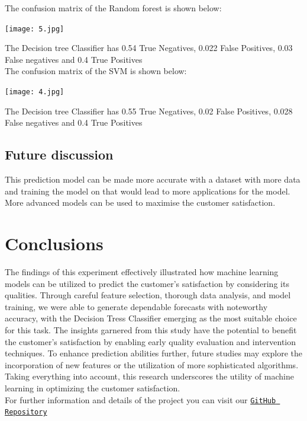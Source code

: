 \documentclass{article}
\begin{document}
The confusion matrix of the Random forest is shown below:\\
\begin{center}
        \texttt{[image: 5.jpg]}
\end{center}



The Decision tree Classifier has 0.54 True Negatives, 0.022 False Positives, 0.03 False negatives and 0.4 True Positives \\

The confusion matrix of the SVM is shown below:\\
\begin{center}
        \texttt{[image: 4.jpg]}
\end{center}



The Decision tree Classifier has 0.55 True Negatives, 0.02 False Positives, 0.028 False negatives and 0.4 True Positives \\


\subsection{Future discussion}
This prediction model can be made more accurate with a dataset with more data and training the model on that would lead to more applications for the model.
More advanced models can be used to maximise the customer satisfaction.

\section{Conclusions}
The findings of this experiment effectively illustrated how machine learning models can be utilized to predict the customer's satisfaction by considering its  qualities. Through careful feature selection, thorough data analysis, and model training, we were able to generate dependable forecasts with noteworthy accuracy, with the Decision Tress Classifier emerging as the most suitable choice for this task. The insights garnered from this study have the potential to benefit the customer's satisfaction by enabling early quality evaluation and intervention techniques. To enhance prediction abilities further, future studies may explore the incorporation of new features or the utilization of more sophisticated algorithms. Taking everything into account, this research underscores the utility of machine learning in optimizing the customer satisfaction.\\
For further information and details of the project you can visit our \href{https://github.com/Christojs/IUFC-Project/blob/main/customer_satisfaction_prediction.ipynb}{{\texttt{GitHub Repository}}}
\end{document}
